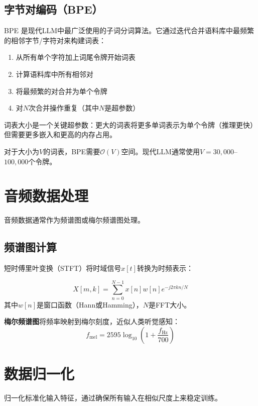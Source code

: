 \subsection{字节对编码（BPE）}

BPE \cite{sennrich2016neural}是现代LLM中最广泛使用的子词分词算法。它通过迭代合并语料库中最频繁的相邻字节/字符对来构建词表：

\begin{enumerate}
    \item 从所有单个字符加上词尾令牌开始词表
    \item 计算语料库中所有相邻对
    \item 将最频繁的对合并为单个令牌
    \item 对$N$次合并操作重复（其中$N$是超参数）
\end{enumerate}

词表大小是一个关键超参数：更大的词表将更多单词表示为单个令牌（推理更快）但需要更多嵌入和更高的内存占用。

对于大小为$V$的词表，BPE需要$\mathcal{O}(V)$空间。现代LLM通常使用$V = 30{,}000$--$100{,}000$个令牌。

\section{音频数据处理}

音频数据通常作为频谱图或梅尔频谱图处理。

\subsection{频谱图计算}

短时傅里叶变换（STFT）将时域信号$x[t]$转换为时频表示：

\begin{equation}
X[m, k] = \sum_{n=0}^{N-1} x[n] w[n] e^{-j 2\pi kn/N}
\end{equation}
其中$w[n]$是窗口函数（Hann或Hamming），$N$是FFT大小。

\textbf{梅尔频谱图}将频率映射到梅尔刻度，近似人类听觉感知：
\begin{equation}
f_{\text{mel}} = 2595 \log_{10}\!\left(1 + \frac{f_{\text{Hz}}}{700}\right)
\end{equation}

\section{数据归一化}

归一化标准化输入特征，通过确保所有输入在相似尺度上来稳定训练。

